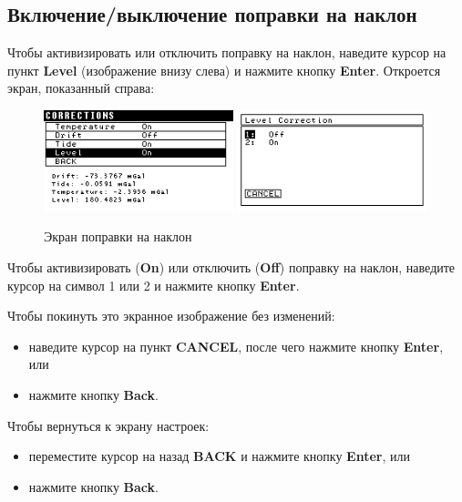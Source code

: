 \subsection{Включение/выключение поправки на наклон}

Чтобы активизировать или отключить поправку на наклон, наведите курсор на пункт
\textbf{Level} (изображение внизу слева) и нажмите кнопку \textbf{Enter}.
Откроется экран, показанный справа:

\begin{figure}[H]
  \centering
  \includegraphics[width=0.49\textwidth]{figures/the_tilt_correction_screen_1}
  \includegraphics[width=0.49\textwidth]{figures/the_tilt_correction_screen_2}
  \caption{Экран поправки на наклон}
  \label{fig:the_tilt_correction_screen}
\end{figure}

Чтобы активизировать (\textbf{On}) или отключить (\textbf{Off}) поправку на
наклон, наведите курсор на символ 1 или 2 и нажмите кнопку \textbf{Enter}.

Чтобы покинуть это экранное изображение без изменений:
\begin{itemize}
  \item наведите курсор на пункт \textbf{CANCEL}, после чего нажмите кнопку
    \textbf{Enter}, или

  \item нажмите кнопку \textbf{Back}.
\end{itemize}

Чтобы вернуться к экрану настроек:
\begin{itemize}
  \item переместите курсор на назад \textbf{BACK} и нажмите кнопку
    \textbf{Enter}, или

  \item нажмите кнопку \textbf{Back}.
\end{itemize}

